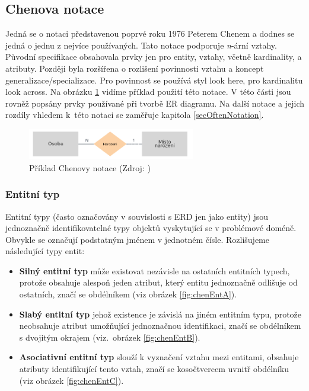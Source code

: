 \documentclass[czech,bachelor,public,dept460,male,oneside]{diploma}
\begin{document}
	\subsection{Chenova notace} \label{erDiagramFeatures}
	Jedná se o notaci představenou poprvé roku 1976 Peterem Chenem \cite{chenERD} a dodnes se jedná o jednu z nejvíce používaných. Tato notace podporuje \textit{n}-ární vztahy. Původní specifikace obsahovala prvky jen pro entity, vztahy, včetně kardinality, a atributy. Později byla rozšířena o rozlišení povinnosti vztahu a koncept generalizace/specializace. Pro povinnost se používá styl look here, pro kardinalitu look across. Na obrázku \ref{fig:chenExample} vidíme příklad použití této notace. V této části jsou rovněž popsány prvky používané při tvorbě ER diagramu. Na další notace a jejich rozdíly vhledem k~této notaci se zaměřuje kapitola \ref{secOftenNotation}.
	
	\begin{figure}[!h]
		\centering
		\includegraphics[width=0.65\textwidth]{Figures/NotationExChen}
		\caption[Příklad Chenovy notace]{Příklad Chenovy notace (Zdroj: \cite{whatIsERD})}
		\label{fig:chenExample}
	\end{figure}
	
		\subsubsection{Entitní typ}
		Entitní typy (často označovány v souvislosti s ERD jen jako entity) jsou jednoznačně identifikovatelné typy objektů vyskytující se v problémové doméně. Obvykle se označují podstatným jménem v jednotném čísle. Rozlišujeme následující typy entit:
	
		\begin{itemize}
			\item \textbf{Silný entitní typ} může existovat nezávisle na ostatních entitních typech, protože obsahuje alespoň jeden atribut, který entitu jednoznačně odlišuje od ostatních, značí se obdélníkem (viz obrázek \ref{fig:chenEntA}).
			
			\item \textbf{Slabý entitní typ} jehož existence je závislá na jiném entitním typu, protože neobsahuje atribut umožňující jednoznačnou identifikaci, značí se obdélníkem s dvojitým okrajem (viz.~obrázek \ref{fig:chenEntB}).
			
			\item \textbf{Asociativní entitní typ} slouží k vyznačení vztahu mezi entitami, obsahuje atributy identifikující tento vztah, značí se kosočtvercem uvnitř obdélníku (viz obrázek \ref{fig:chenEntC}).
		\end{itemize}
	
\end{document}
